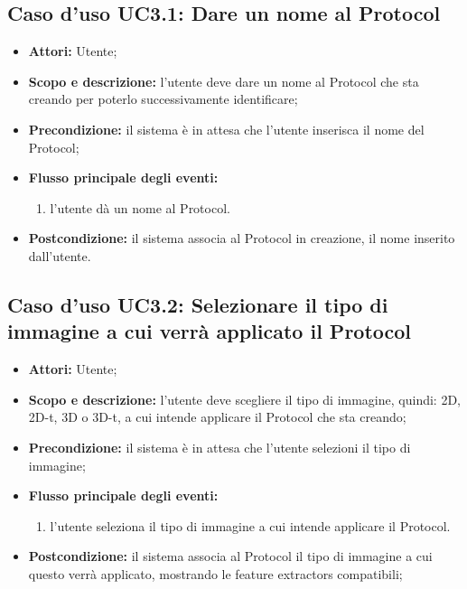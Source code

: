 \subsection{Caso d'uso UC3.1: Dare un nome al Protocol}
\begin{itemize}
\item \textbf{Attori:} Utente;
\item \textbf{Scopo e descrizione:} l'utente deve dare un nome al Protocol\glossario{} che sta creando per poterlo successivamente identificare;
\item \textbf{Precondizione:} il sistema è in attesa che l'utente inserisca il nome del Protocol\glossario{};
\item \textbf{Flusso principale degli eventi:}
\begin{enumerate}
\item l'utente dà un nome al Protocol\glossario{}.
\end{enumerate}
\item \textbf{Postcondizione:} il sistema associa al Protocol\glossario{} in creazione, il nome inserito dall'utente.
\end{itemize}

\subsection{Caso d'uso UC3.2: Selezionare il tipo di immagine a cui verrà applicato il Protocol}
\begin{itemize}
\item \textbf{Attori:} Utente;
\item \textbf{Scopo e descrizione:} l'utente deve scegliere il tipo di immagine, quindi: 2D, 2D-t, 3D o 3D-t, a cui intende applicare il Protocol\glossario{} che sta creando;
\item \textbf{Precondizione:} il sistema è in attesa che l'utente selezioni il tipo di immagine;
\item \textbf{Flusso principale degli eventi:}
\begin{enumerate}
\item l'utente seleziona il tipo di immagine a cui intende applicare il Protocol\glossario{}.
\end{enumerate}
\item \textbf{Postcondizione:} il sistema associa al Protocol\glossario{} il tipo di immagine a cui questo verrà applicato, mostrando le feature extractors\glossario{} compatibili;
\end{itemize}

